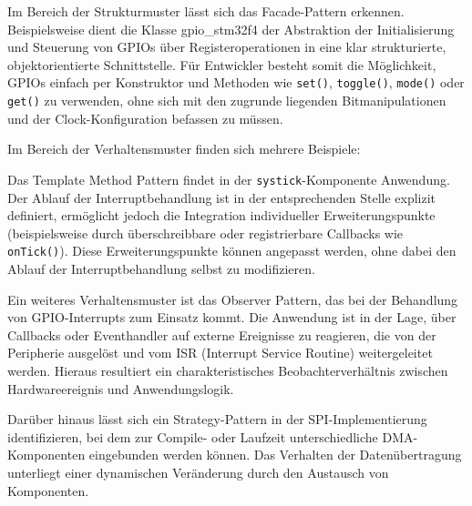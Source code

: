 Im Bereich der Strukturmuster lässt sich das Facade-Pattern erkennen.
Beispielsweise dient die Klasse gpio\_stm32f4 der Abstraktion der Initialisierung und Steuerung von GPIOs über Registeroperationen in eine klar strukturierte, objektorientierte Schnittstelle. 
Für Entwickler besteht somit die Möglichkeit, GPIOs einfach per Konstruktor und Methoden wie \texttt{set()}, \texttt{toggle()}, \texttt{mode()} oder \texttt{get()} zu verwenden, ohne sich mit den zugrunde liegenden Bitmanipulationen und der Clock-Konfiguration befassen zu müssen. 

Im Bereich der Verhaltensmuster finden sich mehrere Beispiele:

Das Template Method Pattern findet in der \texttt{systick}-Komponente Anwendung. 
Der Ablauf der Interruptbehandlung ist in der entsprechenden Stelle explizit definiert, ermöglicht jedoch die Integration individueller Erweiterungspunkte (beispielsweise durch überschreibbare oder registrierbare Callbacks wie \texttt{onTick()}). 
Diese Erweiterungspunkte können angepasst werden, ohne dabei den Ablauf der Interruptbehandlung selbst zu modifizieren.

Ein weiteres Verhaltensmuster ist das Observer Pattern, das bei der Behandlung von GPIO-Interrupts zum Einsatz kommt.
Die Anwendung ist in der Lage, über Callbacks oder Eventhandler auf externe Ereignisse zu reagieren, die von der Peripherie ausgelöst und vom ISR (Interrupt Service Routine) weitergeleitet werden. 
Hieraus resultiert ein charakteristisches Beobachterverhältnis zwischen Hardwareereignis und Anwendungslogik.

Darüber hinaus lässt sich ein Strategy-Pattern in der SPI-Implementierung identifizieren, bei dem zur Compile- oder Laufzeit unterschiedliche DMA-Komponenten eingebunden werden können. 
Das Verhalten der Datenübertragung unterliegt einer dynamischen Veränderung durch den Austausch von Komponenten.

